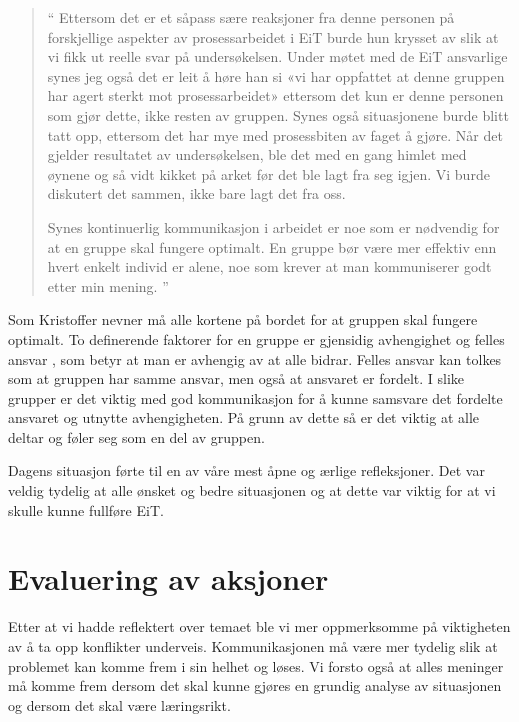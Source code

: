 \begin{quote}``
Ettersom det er et såpass sære reaksjoner fra denne personen på 
forskjellige aspekter av prosessarbeidet i EiT burde hun krysset av slik at vi fikk ut reelle svar på undersøkelsen. 
Under møtet med de EiT ansvarlige synes jeg også det er leit å høre han si «vi har oppfattet at denne gruppen har agert 
sterkt mot prosessarbeidet» ettersom det kun er denne personen som gjør dette, ikke resten av gruppen. Synes 
også situasjonene burde blitt tatt opp, ettersom det har mye med prosessbiten av faget å gjøre. Når det gjelder 
resultatet av undersøkelsen, ble det med en gang himlet med øynene og så vidt kikket på arket før det ble lagt fra 
seg igjen. Vi burde diskutert det sammen, ikke bare lagt det fra oss.

Synes kontinuerlig kommunikasjon i arbeidet er noe som er nødvendig for at en gruppe skal fungere optimalt. En 
gruppe bør være mer effektiv enn hvert enkelt individ er alene, noe som krever at man kommuniserer godt etter min 
mening.
''\end{quote} 

Som Kristoffer nevner må alle kortene på bordet for at gruppen skal fungere optimalt. To definerende faktorer
for en gruppe er gjensidig avhengighet og felles ansvar \cite{Artikkel4}, som betyr at man er avhengig av at
alle bidrar. Felles ansvar kan tolkes som at gruppen har samme ansvar, men også at ansvaret er fordelt. I slike 
grupper er det viktig med god kommunikasjon for å kunne samsvare det fordelte ansvaret og utnytte avhengigheten.
På grunn av dette så er det viktig at alle deltar og føler seg som en del av gruppen.

Dagens situasjon førte til en av våre mest åpne og ærlige refleksjoner. Det var veldig tydelig at
alle ønsket og bedre situasjonen og at dette var viktig for at vi skulle kunne fullføre EiT. 

\section{Evaluering av aksjoner}

Etter at vi hadde reflektert over temaet ble vi mer oppmerksomme på viktigheten av å ta opp konflikter underveis.
Kommunikasjonen må være mer tydelig slik at problemet kan komme frem i sin helhet og løses. 
Vi forsto også at alles meninger må komme frem dersom det skal kunne gjøres en grundig analyse av situasjonen
og dersom det skal være læringsrikt. 

